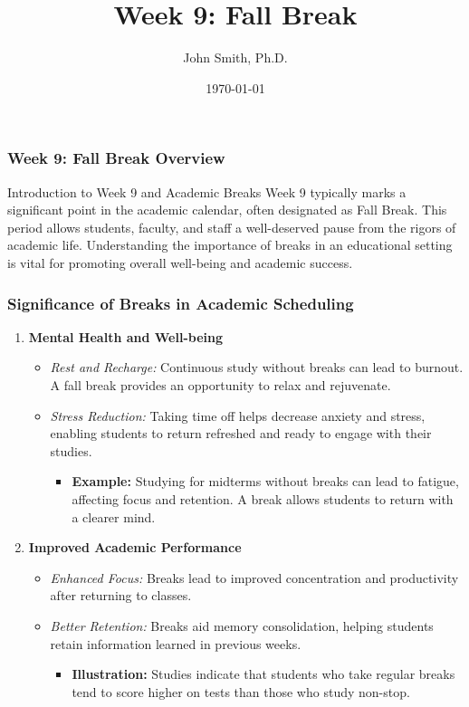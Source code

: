 \documentclass[aspectratio=169]{beamer}
\title[Week 9: Fall Break]{Week 9: Fall Break}
\author[J. Smith]{John Smith, Ph.D.}
\institute[University Name]{Department of Computer Science \\ University Name}
\date{\today}
\begin{document}
\frame{\titlepage}

\begin{frame}[fragile]
    \frametitle{Week 9: Fall Break Overview}
    \begin{block}{Introduction to Week 9 and Academic Breaks}
        Week 9 typically marks a significant point in the academic calendar, often designated as Fall Break. This period allows students, faculty, and staff a well-deserved pause from the rigors of academic life. 
        Understanding the importance of breaks in an educational setting is vital for promoting overall well-being and academic success.
    \end{block}
\end{frame}

\begin{frame}[fragile]
    \frametitle{Significance of Breaks in Academic Scheduling}
    \begin{enumerate}
        \item \textbf{Mental Health and Well-being}
        \begin{itemize}
            \item \textit{Rest and Recharge:} Continuous study without breaks can lead to burnout. A fall break provides an opportunity to relax and rejuvenate.
            \item \textit{Stress Reduction:} Taking time off helps decrease anxiety and stress, enabling students to return refreshed and ready to engage with their studies.
            \begin{itemize}
                \item \textbf{Example:} Studying for midterms without breaks can lead to fatigue, affecting focus and retention. A break allows students to return with a clearer mind.
            \end{itemize}
        \end{itemize}
        
        \item \textbf{Improved Academic Performance}
        \begin{itemize}
            \item \textit{Enhanced Focus:} Breaks lead to improved concentration and productivity after returning to classes.
            \item \textit{Better Retention:} Breaks aid memory consolidation, helping students retain information learned in previous weeks.
            \begin{itemize}
                \item \textbf{Illustration:} Studies indicate that students who take regular breaks tend to score higher on tests than those who study non-stop.
            \end{itemize}
        \end{itemize}
        

\end{enumerate}
\end{frame}
\end{document}
